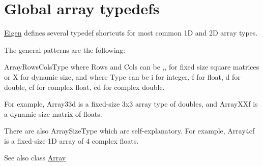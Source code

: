 \hypertarget{group__arraytypedefs}{}\section{Global array typedefs}
\label{group__arraytypedefs}
\hyperlink{namespace_eigen}{Eigen} defines several typedef shortcuts for most common 1D and 2D array types.

The general patterns are the following\+:

{\ttfamily Array\+Rows\+Cols\+Type} where {\ttfamily Rows} and {\ttfamily Cols} can be {},{},{} for fixed size square matrices or {\ttfamily X} for dynamic size, and where {\ttfamily Type} can be {\ttfamily i} for integer, {\ttfamily f} for float, {\ttfamily d} for double, {\ttfamily cf} for complex float, {\ttfamily cd} for complex double.

For example, {\ttfamily Array33d} is a fixed-\/size 3x3 array type of doubles, and {\ttfamily Array\+X\+Xf} is a dynamic-\/size matrix of floats.

There are also {\ttfamily Array\+Size\+Type} which are self-\/explanatory. For example, {\ttfamily Array4cf} is a fixed-\/size 1D array of 4 complex floats.

\begin{DoxySeeAlso}{See also}
class \hyperlink{group___core___module_class_eigen_1_1_array}{Array} 
\end{DoxySeeAlso}
